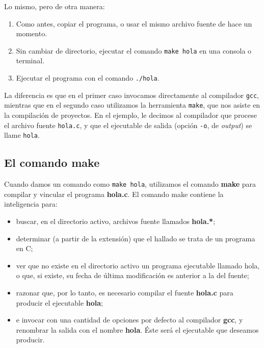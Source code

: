 Lo mismo, pero de otra manera: 

\begin{enumerate}
	\item Como antes, copiar el programa, o usar el mismo archivo fuente de hace un momento.
	\item Sin cambiar de directorio, ejecutar el comando \lstinline{make hola} en una consola o terminal.
	\item Ejecutar el programa con el comando \lstinline{./hola}. 
\end{enumerate}

La diferencia es que en el primer caso invocamos directamente al compilador \texttt{gcc},
mientras que en el segundo caso utilizamos la herramienta \texttt{make}, que nos asiste en la compilación de proyectos. En el ejemplo, le decimos al compilador que procese el archivo fuente \texttt{hola.c}, y que el ejecutable de salida (opción \texttt{-o}, de \textit{output}) se llame \texttt{hola}. 



\subsection{El comando make}
Cuando damos un comando como \lstinline{make hola}, utilizamos el comando \textbf{make} para compilar y vincular el programa \textbf{hola.c}. El comando make contiene la inteligencia para:
\begin{itemize}
 	\item buscar, en el directorio activo, archivos fuente llamados \textbf{hola.*}; 
 	\item determinar (a partir de la extensión) que el hallado se trata de un programa en C;
 	\item ver que no existe en el directorio activo un programa ejecutable llamado hola, o que, si existe, su fecha de última modificación es anterior a la del fuente;
 	\item razonar que, por lo tanto, es necesario compilar el fuente \textbf{hola.c} para producir el ejecutable \textbf{hola};  
 	\item e invocar con una cantidad de opciones por defecto al compilador \textbf{gcc}, y renombrar la salida con el nombre
\textbf{hola}. Éste será el ejecutable que deseamos producir.
\end{itemize} 

